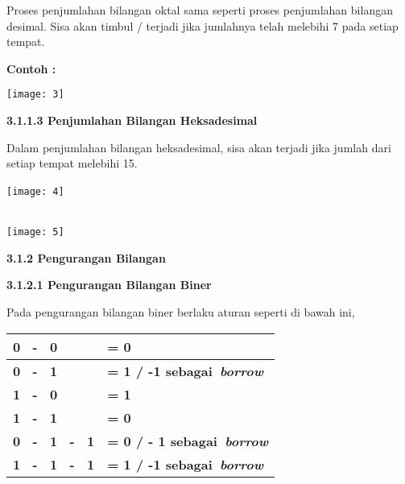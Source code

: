 \documentclass[11pt,fleqn]{book} %
\begin{document}
Proses penjumlahan bilangan oktal sama seperti proses penjumlahan bilangan desimal. Sisa akan timbul / terjadi jika jumlahnya telah melebihi 7 pada setiap tempat.

\noindent \textbf{Contoh :}

\begin{center}
\noindent \texttt{[image: 3]}
\end{center}

\noindent 

\noindent \textbf{3.1.1.3 Penjumlahan Bilangan Heksadesimal}

Dalam penjumlahan bilangan heksadesimal, sisa akan terjadi jika jumlah dari setiap tempat melebihi 15.

\begin{center}
\noindent \texttt{[image: 4]}~ ~ ~ ~ ~ ~ ~ ~ ~ ~ ~ ~ ~ ~ ~ ~ ~ ~ ~ ~ ~ ~ ~ ~ ~ ~ ~ ~ ~ ~ ~ ~ ~ ~ ~ ~ ~ ~ ~ ~ ~ ~ ~ ~~
\end{center}

\noindent 

\begin{center}
\noindent \texttt{[image: 5]}
\end{center}

\noindent 

\noindent \textbf{3.1.2 Pengurangan Bilangan}

\noindent \textbf{3.1.2.1 Pengurangan Bilangan Biner}

Pada pengurangan bilangan biner berlaku aturan seperti di bawah ini,

\begin{center}
\begin{tabular}{|p{0.9in}|p{1.3in}|} \hline 
\textbf{0~ -~ 0} & \textbf{= 0} \\ \hline 
\textbf{0~ -~ 1} & \textbf{= 1 / -1 sebagai~\textit{borrow}} \\ \hline 
\textbf{1~ -~ 0} & \textbf{= 1} \\ \hline 
\textbf{1~ -~ 1} & \textbf{= 0} \\ \hline 
\textbf{0~ -~ 1~ -~ 1} & \textbf{= 0 / - 1 sebagai~\textit{borrow}} \\ \hline 
\textbf{1~ -~ 1~ -~ 1} & \textbf{= 1 / -1 sebagai~\textit{borrow}} \\ \hline 
\end{tabular}
\end{center}
\end{document}

